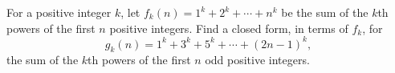 For a positive integer $k$, let $f_k(n)=1^k+2^k+\cdots+n^k$ be the sum of the $k$th powers of the first $n$ positive integers. Find a closed form, in terms of $f_k$, for
\[g_k(n)=1^k+3^k+5^k+\cdots+(2n-1)^k,\]
the sum of the $k$th powers of the first $n$ odd positive integers.
